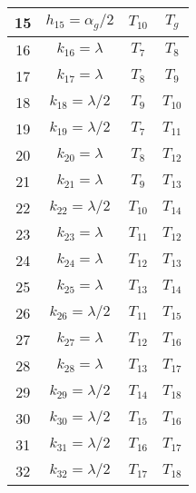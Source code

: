 \documentclass[a4paper, 12pt]{article}
\begin{document}
\begin{table}[h]
\begin{tabular}{|c|c|c|c|}
        \midrule
        15 & $h_{15} = \alpha_g/2$ & $T_{10}$ & $T_g$\\
        \midrule
        16 & $k_{16} = \lambda$ & $T_7$ & $T_8$\\
        \midrule
        17 & $k_{17} = \lambda$ & $T_8$ & $T_9$\\
        \midrule
        18 & $k_{18} = \lambda/2$ & $T_9$ & $T_{10}$\\
        \midrule
        19 & $k_{19} = \lambda/2$ & $T_7$ & $T_{11}$\\
        \midrule
        20 & $k_{20} = \lambda$ & $T_8$ & $T_{12}$\\
        \midrule
        21 & $k_{21} = \lambda$ & $T_9$ & $T_{13}$\\
        \midrule
        22 & $k_{22} = \lambda/2$ & $T_{10}$ & $T_{14}$\\
        \midrule
        23 & $k_{23} = \lambda$ & $T_{11}$ & $T_{12}$\\
        \midrule
        24 & $k_{24} = \lambda$ & $T_{12}$ & $T_{13}$\\
        \midrule
        25 & $k_{25} = \lambda$ & $T_{13}$ & $T_{14}$\\
        \midrule
        26 & $k_{26} = \lambda/2$ & $T_{11}$ & $T_{15}$\\
        \midrule
        27 & $k_{27} = \lambda$ & $T_{12}$ & $T_{16}$\\
        \midrule
        28 & $k_{28} = \lambda$ & $T_{13}$ & $T_{17}$\\
        \midrule
        29 & $k_{29} = \lambda/2$ & $T_{14}$ & $T_{18}$\\
        \midrule
        30 & $k_{30} = \lambda/2$ & $T_{15}$ & $T_{16}$\\
        \midrule
        31 & $k_{31} = \lambda/2$ & $T_{16}$ & $T_{17}$\\
        \midrule
        32 & $k_{32} = \lambda/2$ & $T_{17}$ & $T_{18}$\\
        \bottomrule
    \end{tabular}
\end{table}
\end{document}
